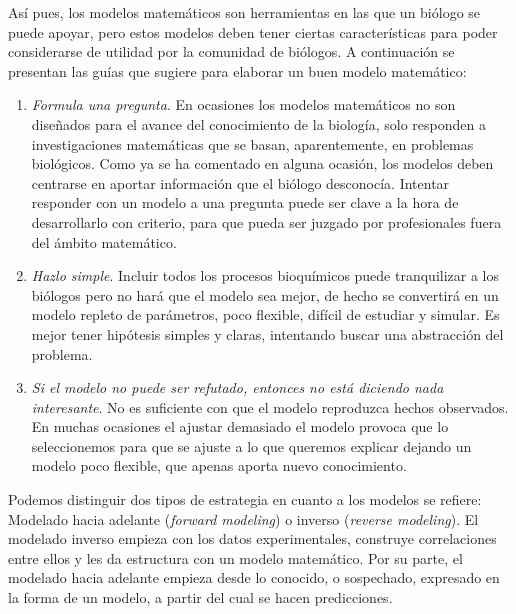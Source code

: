 Así pues, los modelos matemáticos son herramientas en las que un biólogo se puede apoyar, pero estos modelos deben tener ciertas características para poder considerarse de utilidad por la comunidad de biólogos. A continuación se presentan las guías que sugiere \cite{Gunawardena2014} para elaborar un buen modelo matemático:

\begin{enumerate}
	\item \textit{Formula una pregunta}. En ocasiones los modelos matemáticos no son diseñados para el avance del conocimiento de la biología, solo responden a investigaciones matemáticas que se basan, aparentemente, en problemas biológicos. Como ya se ha comentado en alguna ocasión, los modelos deben centrarse en aportar información que el biólogo desconocía. Intentar responder con un modelo a una pregunta puede ser clave a la hora de desarrollarlo con criterio, para que pueda ser juzgado por profesionales fuera del ámbito matemático. 
	
	\item \textit{Hazlo simple}. Incluir todos los procesos bioquímicos puede tranquilizar a los biólogos pero no hará que el modelo sea mejor, de hecho se convertirá en un modelo repleto de parámetros, poco flexible, difícil de estudiar y simular. Es mejor tener hipótesis simples y claras, intentando buscar una abstracción del problema.
	
	\item \textit{Si el modelo no puede ser refutado, entonces no está diciendo nada interesante}. No es suficiente con que el modelo reproduzca hechos observados. En muchas ocasiones el ajustar demasiado el modelo provoca que lo seleccionemos para que se ajuste a lo que queremos explicar dejando un modelo poco flexible, que apenas aporta nuevo conocimiento.
\end{enumerate}

Podemos distinguir dos tipos de estrategia en cuanto a los modelos se refiere: Modelado hacia adelante (\textit{forward modeling}) o inverso (\textit{reverse modeling}). El modelado inverso empieza con los datos experimentales, construye correlaciones entre ellos y les da estructura con un modelo matemático. Por su parte, el modelado hacia adelante empieza desde lo conocido, o sospechado, expresado en la forma de un modelo, a partir del cual se hacen predicciones. 

